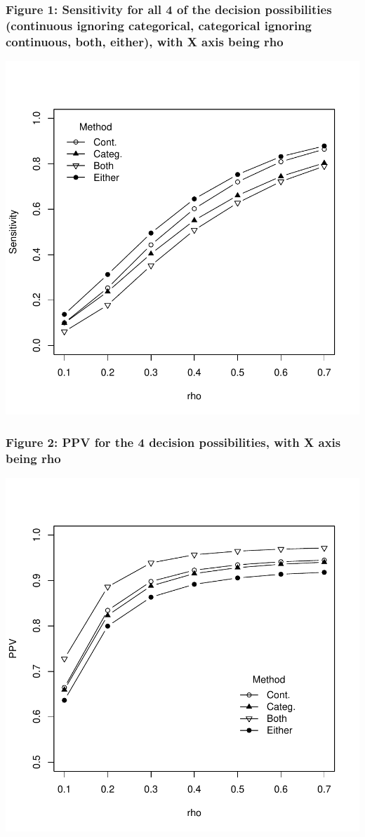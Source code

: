 \documentclass{article}
\begin{document}
\subsubsection*{Figure 1: Sensitivity for all 4 of the decision possibilities (continuous ignoring categorical, categorical ignoring continuous, both, either), with X axis being rho}

\includegraphics{accuracy_category-dd}

\subsubsection*{Figure 2: PPV for the 4 decision possibilities, with X axis being rho}

\includegraphics{accuracy_category-ee}
\end{document}
